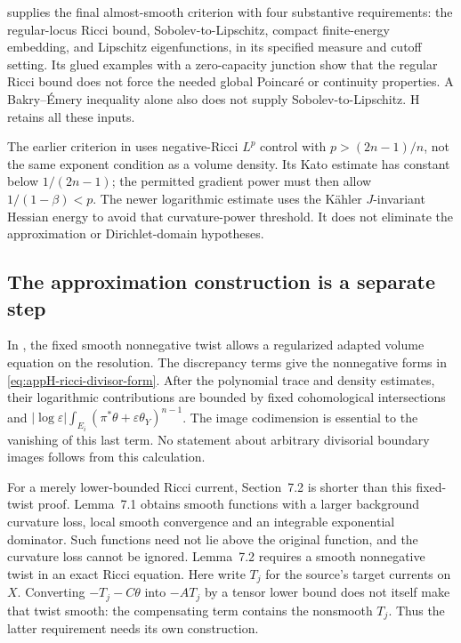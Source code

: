\cite{Honda18AlmostSmoothV3} supplies the final almost-smooth
criterion with four substantive requirements: the regular-locus
Ricci bound, Sobolev-to-Lipschitz, compact finite-energy
embedding, and Lipschitz eigenfunctions, in its specified
measure and cutoff setting. Its glued examples with a
zero-capacity junction show that the regular Ricci bound
does not force the needed global Poincar\'e or continuity
properties. A Bakry--\'Emery inequality alone also does
not supply Sobolev-to-Lipschitz. H retains all these inputs.

The earlier criterion in
\cite[Theorem~1.5]{CCHSTT25CurrentsV1} uses negative-Ricci
\(L^p\) control with \(p>(2n-1)/n\), not the same
exponent condition as a volume density. Its Kato estimate
has constant below \(1/(2n-1)\); the permitted gradient
power must then allow \(1/(1-\beta)<p\).
The newer logarithmic estimate uses the K\"ahler
\(J\)-invariant Hessian energy to avoid that curvature-power
threshold. It does not eliminate the approximation or
Dirichlet-domain hypotheses.

\subsection{The approximation construction is a separate step}

In \cite[Sections~4 and~6]{GSS26RicciEntropyV1}, the
fixed smooth nonnegative twist allows a regularized adapted
volume equation on the resolution. The discrepancy terms
give the nonnegative forms in
\eqref{eq:appH-ricci-divisor-form}. After the polynomial
trace and density estimates, their logarithmic contributions
are bounded by fixed cohomological intersections and
\(|\log\varepsilon|\int_{E_i}
(\pi^*\theta+\varepsilon\theta_Y)^{n-1}\).
The image codimension is essential to the vanishing of
this last term. No statement about arbitrary divisorial
boundary images follows from this calculation.

For a merely lower-bounded Ricci current, Section~7.2 is
shorter than this fixed-twist proof. Lemma~7.1 obtains
smooth functions with a larger background curvature loss,
local smooth convergence and an integrable exponential
dominator. Such functions need not lie above the original
function, and the curvature loss cannot be ignored.
Lemma~7.2 requires a smooth nonnegative twist in an exact
Ricci equation. Here write \(T_j\) for the source's target currents on \(X\).
Converting \(-T_j-C\theta\) into \(-AT_j\) by a tensor lower
bound does not itself make that twist smooth: the compensating
term contains the nonsmooth \(T_j\).
Thus the latter requirement needs its own construction.

